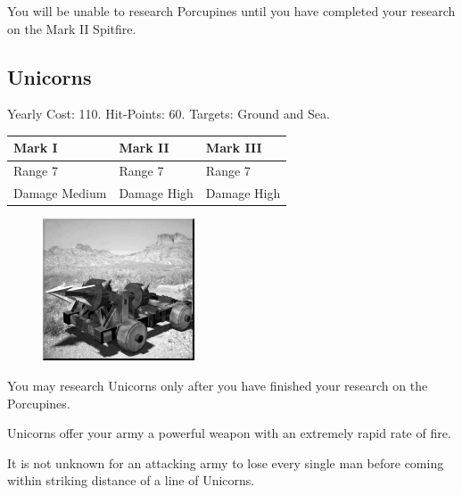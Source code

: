 You will be unable to research Porcupines until you have completed your research on the Mark II Spitfire.

\clearpage

\subsection{Unicorns}


\begin{center}
	Yearly Cost: 110. Hit-Points: 60. Targets: Ground and Sea.
\end{center}

\begin{tabular}{ | p{4cm} | p{4cm} | p{4cm} |}
	\hline
	\textbf{Mark I}	& \textbf{Mark II} & \textbf{Mark III} \\ \hline
	Range 7	& Range 7 & Range 7 \\ \hline
	Damage Medium	& Damage High & Damage High \\ \hline
	\hline
\end{tabular}

\begin{figure}
	\vspace{-20pt}
	\begin{center}
		\includegraphics[width=0.4\textwidth]{Aunicorn}
	\end{center}
	\vspace{-20pt}
\end{figure}

You may research Unicorns only after you have finished your research on the Porcupines.

Unicorns offer your army a powerful weapon with an extremely rapid rate of fire.

It is not unknown for an attacking army to lose every single man before coming within striking distance of a line of Unicorns.